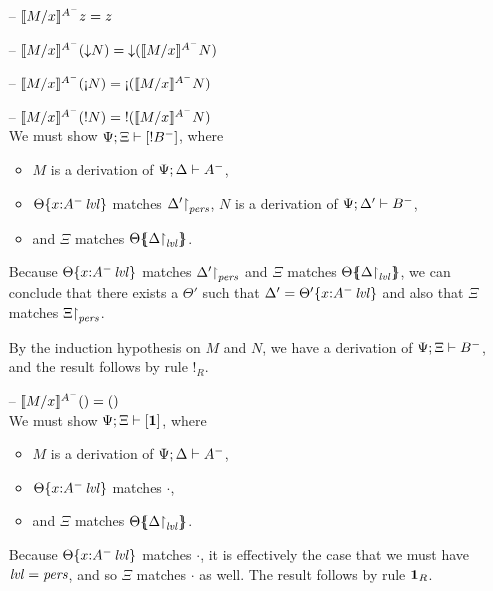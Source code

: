 \begin{itemize}
\item[--] $\rsubsta{M}{x}{z}{A^-} = z$
\item[--] $\rsubsta{M}{x}{(\tdownr{N})}{A^-}
           = \tdownr{(\rsubsta{M}{x}{N}{A^-})}$
\item[--] $\rsubsta{M}{x}{(\tgnabr{N})}{A^-}
           = \tgnabr{(\rsubsta{M}{x}{N}{A^-})}$
\item[--] $\rsubsta{M}{x}{(\tbangr{N})}{A^-}
           = \tbangr{(\rsubsta{M}{x}{N}{A^-})}$\smallskip\\
  We must show $\foc{\Psi}{\Xi}{[{!}B^-]}$, where 
  \begin{itemize}
  \item $M$ is a derivation of $\foc{\Psi}{\Delta}{A^-}$, 
  \item $\tackon{\Theta}{x{:}\islvl{A^-}}$ matches 
     $\restrictto{\Delta'}{\mpers}$,
     $N$ is a derivation of $\foc{\Psi}{\Delta'}{B^-}$, 
  \item and $\Xi$ matches $\frameoff{\Theta}{\restrictto{\Delta}{\mlvl}}$.
  \end{itemize}
  Because $\tackon{\Theta}{x{:}\islvl{A^-}}$ matches
  $\restrictto{\Delta'}{\mpers}$ and $\Xi$ matches 
  $\frameoff{\Theta}{\restrictto{\Delta}{\mlvl}}$, we can conclude that
  there exists a $\Theta'$ such that
  $\Delta' = \tackon{\Theta'}{x{:}\islvl{A^-}}$ and also that
  $\Xi$ matches $\restrictto{\Xi}{\mpers}$.

  By the induction hypothesis on $M$ and $N$, 
  we have a derivation of $\foc{\Psi}{\Xi}{B^-}$, 
  and the result follows by rule ${!}_R$. 

\smallskip

\item[--] $\rsubsta{M}{x}{\toner}{A^-} = \toner$ \smallskip\\
  We must show $\foc{\Psi}{\Xi}{[\one]}$, where
  \begin{itemize}
  \item $M$ is a derivation of $\foc{\Psi}{\Delta}{A^-}$, 
  \item $\tackon{\Theta}{x{:}\islvl{A^-}}$ matches $\cdot$,
  \item and $\Xi$ matches $\frameoff{\Theta}{\restrictto{\Delta}{\mlvl}}$.
  \end{itemize}
  Because $\tackon{\Theta}{x{:}\islvl{A^-}}$ matches $\cdot$, it is
  effectively the case that we must have $\mlvl = \mpers$, and so 
  $\Xi$ matches $\cdot$ as well. The result follows by rule ${\one}_R$. 


\end{itemize}

